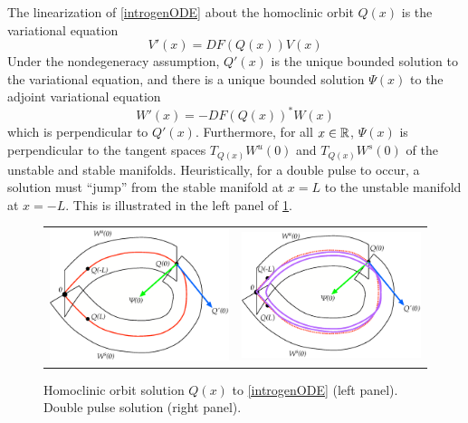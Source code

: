\documentclass[thesis.tex]{subfiles}
\begin{document}
The linearization of \cref{introgenODE} about the homoclinic orbit $Q(x)$ is the variational equation
\begin{equation}\label{introvareq}
V'(x) = DF(Q(x)) V(x)
\end{equation}
Under the nondegeneracy assumption, $Q'(x)$ is the unique bounded solution to the variational equation, and there is a unique bounded solution $\Psi(x)$ to the adjoint variational equation
\begin{equation}\label{introadjvareq}
W'(x) = -DF(Q(x))^* W(x)
\end{equation}
which is perpendicular to $Q'(x)$. Furthermore, for all $x \in \mathbb{R}$, $\Psi(x)$ is perpendicular to the tangent spaces $T_{Q(x)}W^u(0)$ and $T_{Q(x)}W^s(0)$ of the unstable and stable manifolds. Heuristically, for a double pulse to occur, a solution must ``jump'' from the stable manifold at $x = L$ to the unstable manifold at $x = -L$. This is illustrated in the left panel of \cref{fig:wswu}.
\begin{figure}
\begin{center}
\begin{tabular}{cc}
\includegraphics[width=8cm]{images/intro/WsWu} &
\includegraphics[width=8cm]{images/intro/WsWuDouble}
\end{tabular}
\caption{Homoclinic orbit solution $Q(x)$ to \cref{introgenODE} (left panel). Double pulse solution (right panel). }
\label{fig:wswu}
\end{center}
\end{figure}
\end{document}
